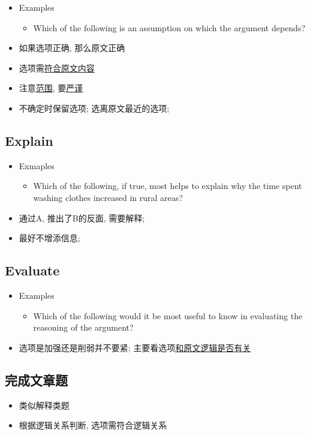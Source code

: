     \begin{itemize}
      \item Examples
      \begin{itemize}
        \item Which of the following is an assumption on which the
        argument depends?
      \end{itemize}

      \item 如果选项正确, 那么原文正确
      \item 选项需\uline{符合原文内容}
      \item 注意\uline{范围}, 要\uline{严谨}
      \item 不确定时保留选项; 选离原文最近的选项;
    \end{itemize}

  \subsection{Explain}

    \begin{itemize}
      \item Exmaples
      \begin{itemize}
        \item Which of the following, if true, most helps to explain why
        the time spent washing clothes increased in rural areas?
      \end{itemize}

      \item 通过A, 推出了B的反面, 需要解释;
      \item 最好不增添信息;
    \end{itemize}

  \subsection{Evaluate}

    \begin{itemize}
      \item Examples
      \begin{itemize}
        \item Which of the following would it be most useful to know in
        evaluating the reasoning of the argument?
      \end{itemize}

      \item 选项是加强还是削弱并不要紧; 主要看选项\uline{和原文逻辑是否有关}
    \end{itemize}

  \subsection{完成文章题}

    \begin{itemize}
      \item 类似解释类题
      \item 根据逻辑关系判断, 选项需符合逻辑关系
    \end{itemize}